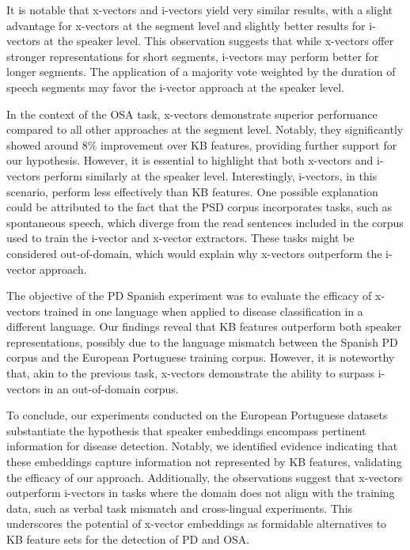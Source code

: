 It is notable that x-vectors and i-vectors yield very similar results, with a slight advantage for x-vectors at the segment level and slightly better results for i-vectors at the speaker level. This observation suggests that while x-vectors offer stronger representations for short segments, i-vectors may perform better for longer segments. The application of a majority vote weighted by the duration of speech segments may favor the i-vector approach at the speaker level.

In the context of the OSA task, x-vectors demonstrate superior performance compared to all other approaches at the segment level. Notably, they significantly showed around 8\% improvement over KB features, providing further support for our hypothesis. However, it is essential to highlight that both x-vectors and i-vectors perform similarly at the speaker level. Interestingly, i-vectors, in this scenario, perform less effectively than KB features. One possible explanation could be attributed to the fact that the PSD corpus incorporates tasks, such as spontaneous speech, which diverge from the read sentences included in the corpus used to train the i-vector and x-vector extractors. These tasks might be considered out-of-domain, which would explain why x-vectors outperform the i-vector approach.

The objective of the PD Spanish experiment was to evaluate the efficacy of x-vectors trained in one language when applied to disease classification in a different language. Our findings reveal that KB features outperform both speaker representations, possibly due to the language mismatch between the Spanish PD corpus and the European Portuguese training corpus. However, it is noteworthy that, akin to the previous task, x-vectors demonstrate the ability to surpass i-vectors in an out-of-domain corpus.

To conclude, our experiments conducted on the European Portuguese datasets substantiate the hypothesis that speaker embeddings encompass pertinent information for disease detection. Notably, we identified evidence indicating that these embeddings capture information not represented by KB features, validating the efficacy of our approach. Additionally, the observations suggest that x-vectors outperform i-vectors in tasks where the domain does not align with the training data, such as verbal task mismatch and cross-lingual experiments. This underscores the potential of x-vector embeddings as formidable alternatives to KB feature sets for the detection of PD and OSA.

